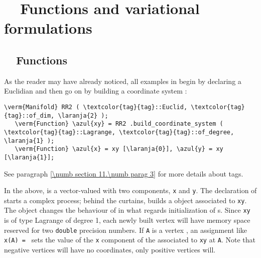 
\chapter{~~Functions and variational formulations}\label{\numb section 5}


\section{~~Functions}\label{\numb section 5.\numb parag 1}

As the reader may have already noticed, all examples in {\maniFEM} begin by declaring a
Euclidian {\small\tt {}} and then go on by building a coordinate system :

\begin{Verbatim}[commandchars=\\\{\},formatcom=\small\tt,
   baselinestretch=0.94,framesep=2mm                     ]
   \verm{Manifold} RR2 ( \textcolor{tag}{tag}::Euclid, \textcolor{tag}{tag}::of_dim, \laranja{2} );
   \verm{Function} \azul{xy} = RR2 .build_coordinate_system ( \textcolor{tag}{tag}::Lagrange, \textcolor{tag}{tag}::of_degree, \laranja{1} );
   \verm{Function} \azul{x} = xy [\laranja{0}], \azul{y} = xy [\laranja{1}];
\end{Verbatim}

See paragraph \ref{\numb section 11.\numb parag 3} for more details about tags.

In the above, {\small\tt {}} is a vector-valued {\small\tt {}}
with two components, {\small\tt x} and {\small\tt y}.
The declaration of {\small\tt{}} starts a complex process; behind the curtains,
{\maniFEM} builds a {\small\tt {}} object associated to {\small\tt xy}.
The {\small\tt {}} object changes the behaviour of {\maniFEM} in what regards
initialization of {\small\tt {}}s.
Since {\small\tt xy} is of type Lagrange of degree 1, each newly built vertex
{\small\tt {}} will have memory space reserved for two {\small\tt double}
precision numbers.
If {\small\tt A} is a vertex {\small\tt {}}, an assignment like
{\small\tt x(A) = } sets the value of the {\small\tt x} component of the
{\small\tt {}} associated to {\small\tt xy} at {\small\tt A}.
Note that negative vertices will have no coordinates, only positive vertices will.

